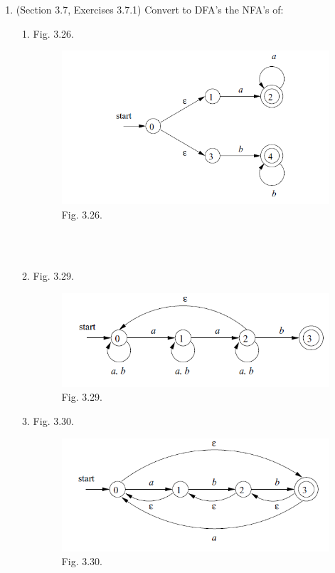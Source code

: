 \documentclass[12pt,a4paper]{article}
\begin{document}
\begin{enumerate}
\item (Section 3.7, Exercises 3.7.1) Convert to DFA's the NFA's of:

    \begin{enumerate}
    \item Fig. 3.26.

    \begin{figure}[h]
    \center
    \includegraphics[width=0.8\linewidth]{Fig3-26}\vspace{-10pt}
    \caption{Fig. 3.26.} \label{fig:3.26}\vspace{-10pt}
    \end{figure}

    \textrm{\\}
    \textrm{\\}

    \item Fig. 3.29.

    \begin{figure}[h]
    \center
    \includegraphics[width=0.8\linewidth]{Fig3-29}\vspace{-10pt}
    \caption{Fig. 3.29.} \label{fig:3.29}\vspace{-10pt}
    \end{figure}

    \newpage

    \item Fig. 3.30.

    \begin{figure}[h]
    \center
    \includegraphics[width=0.8\linewidth]{Fig3-30}\vspace{-10pt}
    \caption{Fig. 3.30.} \label{fig:3.30}\vspace{-10pt}
    \end{figure}


\end{enumerate}
\end{enumerate}
\end{document}
